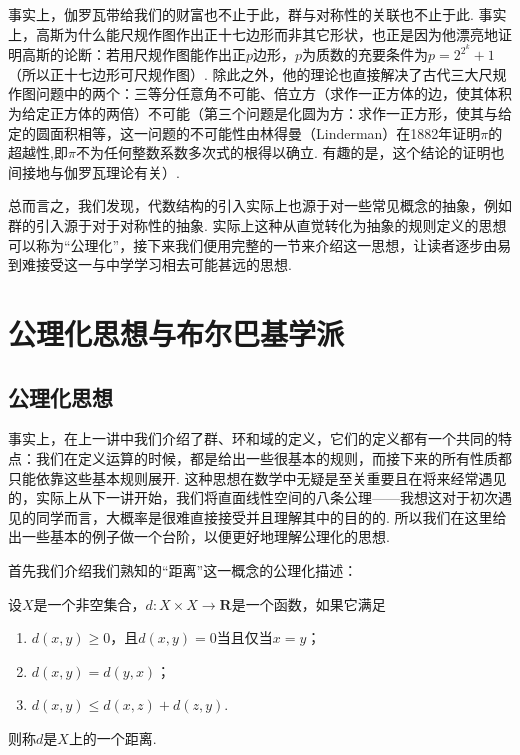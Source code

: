 事实上，伽罗瓦带给我们的财富也不止于此，群与对称性的关联也不止于此. 事实上，高斯为什么能尺规作图作出正十七边形而非其它形状，也正是因为他漂亮地证明高斯的论断：若用尺规作图能作出正$p$边形，$p$为质数的充要条件为$p=2^{2^k}+1$（所以正十七边形可尺规作图）. 除此之外，他的理论也直接解决了古代三大尺规作图问题中的两个：三等分任意角不可能、倍立方（求作一正方体的边，使其体积为给定正方体的两倍）不可能（第三个问题是化圆为方：求作一正方形，使其与给定的圆面积相等，这一问题的不可能性由林得曼（Linderman）在1882年证明$\pi$的超越性,即$\pi$不为任何整数系数多次式的根得以确立. 有趣的是，这个结论的证明也间接地与伽罗瓦理论有关）.

总而言之，我们发现，代数结构的引入实际上也源于对一些常见概念的抽象，例如群的引入源于对于对称性的抽象. 实际上这种从直觉转化为抽象的规则定义的思想可以称为``公理化''，接下来我们便用完整的一节来介绍这一思想，让读者逐步由易到难接受这一与中学学习相去可能甚远的思想.

\section{公理化思想与布尔巴基学派}

\subsection{公理化思想}

事实上，在上一讲中我们介绍了群、环和域的定义，它们的定义都有一个共同的特点：我们在定义运算的时候，都是给出一些很基本的规则，而接下来的所有性质都只能依靠这些基本规则展开. 这种思想在数学中无疑是至关重要且在将来经常遇见的，实际上从下一讲开始，我们将直面线性空间的八条公理——我想这对于初次遇见的同学而言，大概率是很难直接接受并且理解其中的目的的. 所以我们在这里给出一些基本的例子做一个台阶，以便更好地理解公理化的思想.

首先我们介绍我们熟知的``距离''这一概念的公理化描述：
\begin{definition}
    设$X$是一个非空集合，$d:X\times X\to \mathbf{R}$是一个函数，如果它满足
    \begin{enumerate}
        \item $d(x,y)\geqslant 0$，且$d(x,y)=0$当且仅当$x=y$；

        \item $d(x,y)=d(y,x)$；

        \item $d(x,y)\leqslant d(x,z)+d(z,y)$.
    \end{enumerate}
    则称$d$是$X$上的一个距离.
\end{definition}

